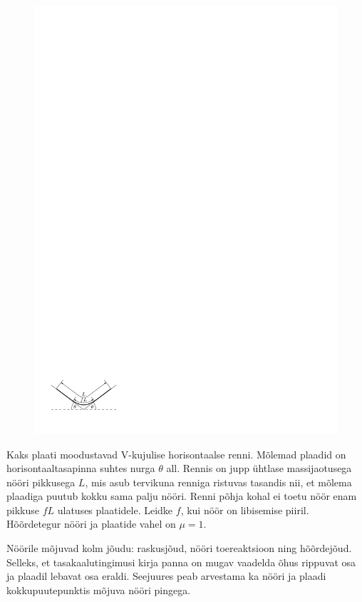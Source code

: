 
\begin{figure}
\includegraphics[width=\linewidth]{2012-lahg-09-n88r_ipe}
\end{figure}
Kaks plaati moodustavad V-kujulise horisontaalse renni. Mõlemad plaadid on
horisontaaltasapinna suhtes nurga $\theta$ all.
Rennis on jupp ühtlase
massijaotusega nööri pikkusega $L$, mis asub tervikuna renniga ristuvas tasandis
nii, et mõlema plaadiga puutub kokku sama palju nööri.
Renni põhja kohal ei toetu nöör enam pikkuse $fL$
ulatuses plaatidele. Leidke $f$, kui nöör on libisemise piiril. Hõõrdetegur nööri ja plaatide
vahel on $\mu = 1$.

\hint
Nöörile mõjuvad kolm jõudu: raskusjõud, nööri toereaktsioon ning hõõrdejõud. Selleks, et tasakaalutingimusi kirja panna on mugav vaadelda õhus rippuvat osa ja plaadil lebavat osa eraldi. Seejuures peab arvestama ka nööri ja plaadi kokkupuutepunktis mõjuva nööri pingega.

